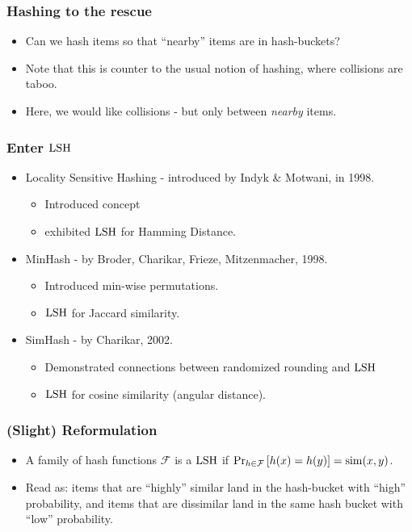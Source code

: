 \documentclass{beamer}
\begin{document}
\begin{frame}
\frametitle{Hashing to the rescue}
\begin{itemize}
\item Can we hash items so that ``nearby'' items are in  hash-buckets?
\item Note that this is counter to the usual notion of hashing, where collisions are taboo. 
\item Here, we would like collisions - but only between {\em nearby} items.
\end{itemize}
\end{frame}

\begin{frame}
\frametitle{Enter $\mathrm{LSH}$}
\begin{itemize}
\item Locality Sensitive Hashing - introduced by Indyk \& Motwani, in 1998. 
\begin{itemize}
\item Introduced concept
\item exhibited $\mathrm{LSH}$ for Hamming Distance.
\end{itemize}
\pause
\item MinHash - by Broder, Charikar, Frieze, Mitzenmacher, 1998.
\begin{itemize}
\item Introduced min-wise permutations.
\item $\mathrm{LSH}$ for Jaccard similarity.
\end{itemize}\pause
\item SimHash - by Charikar, 2002. 
\begin{itemize}
\item Demonstrated connections between randomized rounding and $\mathrm{LSH}$
\item $\mathrm{LSH}$ for cosine similarity (angular distance).
\end{itemize}
\end{itemize}
\end{frame}

\begin{frame}
\frametitle{(Slight) Reformulation}
\begin{itemize}
\item A family of hash functions $\mathcal{F}$ is a $\mathrm{LSH}$ if $\Pr_{h\in\mathcal{F}}\left[h(x)=h(y)\right] = \mathrm{sim}(x, y)$.
\item Read as: items that are ``highly'' similar land in the  hash-bucket with ``high'' probability, and items that are dissimilar land in the same hash bucket with ``low'' probability.
\end{itemize}
\end{frame}
\end{document}
